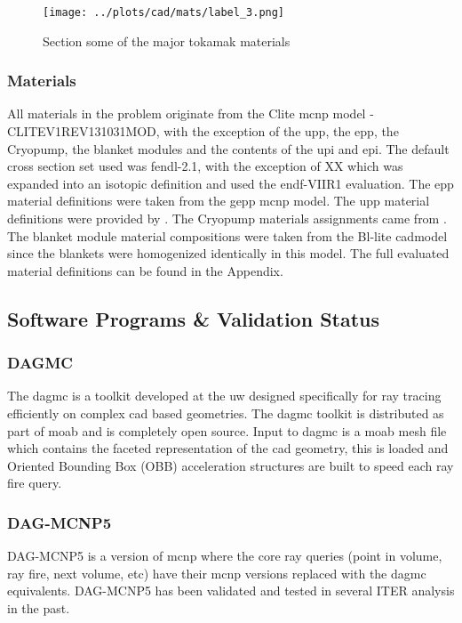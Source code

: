 \documentclass[12pt]{article}
\begin{document}
\begin{figure}[p]
  \centering
  \texttt{[image: ../plots/cad/mats/label\_3.png]}
  \caption{Section some of the major tokamak materials}
  \label{fig:material_assign_2}
\end{figure}

\newpage
\clearpage
\subsubsection{Materials}
All materials in the problem originate from the Clite \gls{mcnp} model -
CLITE\textunderscore V1\textunderscore REV131031\textunderscore MOD, with the
exception of the \gls{upp}, the \gls{epp}, the
Cryopump, the blanket modules and the contents of the \gls{upi} and \gls{epi}.
The default cross section set used was \gls{fendl}-2.1, with the exception of XX
which was expanded into an isotopic definition and used the \gls{endf}-VIIR1
evaluation. The \gls{epp} material definitions were taken from the \gls{gepp}
\gls{mcnp} model\cite{epp_materials}. The \gls{upp} material definitions were
provided by \cite{bertalot_communication}. The Cryopump materials assignments
came from \cite{cryopump_communication}. The blanket module material
compositions were taken from the Bl-lite \gls{cad}model since the blankets were
homogenized identically in this model. The full evaluated material definitions
can be found in the Appendix.
\newpage
\subsection{Software Programs \& Validation Status}
\subsubsection{DAGMC}
The \gls{dagmc} is a toolkit developed at the \gls{uw}
designed specifically for ray tracing efficiently on complex \gls{cad} based
geometries. The \gls{dagmc} toolkit is distributed as part of \gls{moab} and
is completely open source. Input to \gls{dagmc} is a \gls{moab} mesh file
which contains the faceted representation of the \gls{cad} geometry, this
is loaded and Oriented Bounding Box (OBB) acceleration structures are built
to speed each ray fire query.
\subsubsection{DAG-MCNP5}
DAG-MCNP5 \cite{dagmc} is a version of \gls{mcnp} \cite{mcnp} where the core ray
queries (point in volume, ray fire, next volume, etc) have their \gls{mcnp}
versions replaced with the \gls{dagmc} equivalents. DAG-MCNP5 has been validated
\cite{dagmc_validation} and tested in several ITER analysis in the past.
\end{document}
